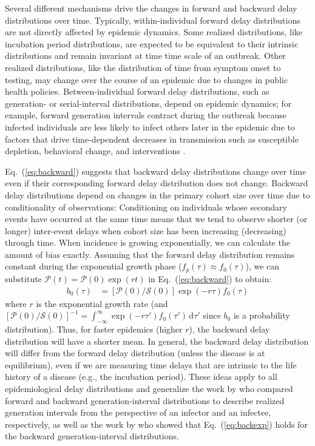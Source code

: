 \documentclass[12pt]{article}
\newcommand{\eref}[1]{Eq.~(\ref{eq:#1})}
\newcommand{\dd}[1]{\ensuremath{\, \mathrm{d}#1}}
\newcommand{\dtau}{\dd{\tau}}
\newcommand{\psize}{{\mathcal P}} %
\newcommand{\ssize}{{\mathcal S}} %
\begin{document}
Several different mechanisms drive the changes in forward and backward delay distributions over time.
Typically, within-individual forward delay distributions are not directly affected by epidemic dynamics.
Some realized distributions, like incubation period distributions, are expected to be equivalent to their intrinsic distributions and remain invariant at time time scale of an outbreak.
Other realized distributions, like the distribution of time from symptom onset to testing, may change over the course of an epidemic due to changes in public health policies.
Between-individual forward delay distributions, such as generation- or serial-interval distributions, depend on epidemic dynamics;
for example, forward generation intervals contract during the outbreak because infected individuals are less likely to infect others later in the epidemic due to factors that drive time-dependent decreases in transmission such as susceptible depletion, behavioral change, and interventions \citep{champredon2015intrinsic}.

\eref{backward} suggests that backward delay distributions change over time even if their corresponding forward delay distribution does not change.
Backward delay distributions depend on changes in the primary cohort size over time due to conditionality of observations:
Conditioning on individuals whose secondary events have occurred at the same time means that we tend to observe shorter (or longer) inter-event delays when cohort size has been increasing (decreasing) through time.
When incidence is growing exponentially, we can calculate the amount of bias exactly.
Assuming that the forward delay distribution remains constant during the exponential growth phase ($f_p(\tau) \approx f_0(\tau)$), we can substitute $\psize(t) = \psize(0) \exp(rt)$ in \eref{backward} to obtain:
\begin{align}
b_0(\tau) &= \left[\psize(0)/\ssize(0)\right] \exp(-r\tau) f_0(\tau)
\label{eq:backexp}
\end{align}
where $r$ is the exponential growth rate (and $\left[\psize(0)/\ssize(0)\right]^{-1} = \int_{-\infty}^{\infty} \exp(-r\tau') f_0(\tau') \dtau'$ since $b_0$ is a probability distribution).
Thus, for faster epidemics (higher $r$), the backward delay distribution will have a shorter mean.
In general, the backward delay distribution will differ from the forward delay distribution (unless the disease is at equilibrium), even if we are measuring time delays that are intrinsic to the life history of a disease (e.g., the incubation period).
These ideas apply to all epidemiological delay distributions and generalize the work by \cite{champredon2015intrinsic} who compared forward and backward generation-interval distributions to describe realized generation intervals from the perspective of an infector and an infectee, respectively, as well as the work by \cite{britton2019estimation} who showed that \eref{backexp} holds for the backward generation-interval distributions.
\end{document}
